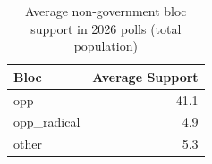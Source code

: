 \begin{table}
\caption{Average non-government bloc support in 2026 polls (total population)}
\label{tab:poll_blocks_2026}
\begin{tabular}{lr}
\toprule
Bloc & Average Support \\
\midrule
opp & 41.1 \\
opp_radical & 4.9 \\
other & 5.3 \\
\bottomrule
\end{tabular}
\end{table}
